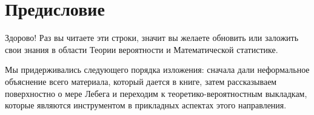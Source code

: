 \documentclass[../TV&MS.tex]{subfiles}
\begin{document}
\section*{Предисловие}

	Здорово! Раз вы читаете эти строки, значит вы желаете обновить или 
	заложить свои знания в области Теории вероятности и Математической статистике. 

	Мы придерживались следующего порядка изложения: сначала дали неформальное
	объяснение всего материала, который дается в книге, затем рассказываем
	поверхностно о мере Лебега и переходим к теоретико-вероятностным выкладкам,
	которые являются инструментом в прикладных аспектах этого направления.

\newpage
\end{document}
